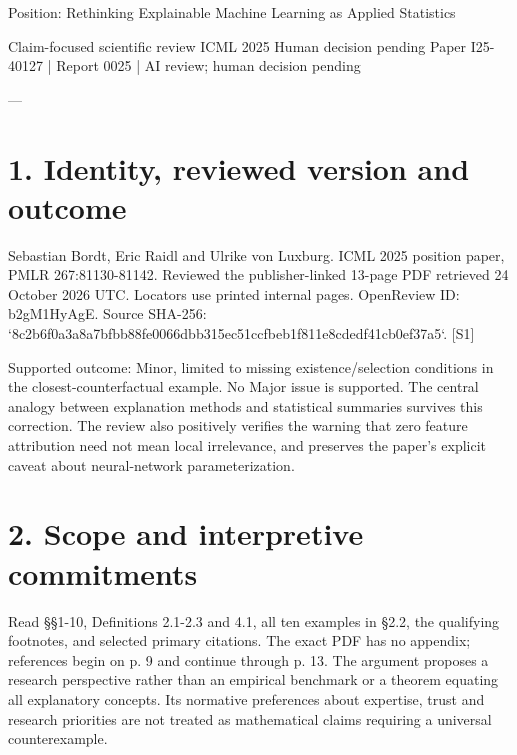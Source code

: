 \documentclass[10pt]{article}
\begin{document}
Position: Rethinking Explainable Machine Learning as Applied Statistics\par
Claim-focused scientific review ICML 2025 Human decision pending
Paper I25-40127 | Report 0025 | AI review; human decision pending\par
---\par
\section*{1. Identity, reviewed version and outcome}
Sebastian Bordt, Eric Raidl and Ulrike von Luxburg. ICML 2025 position paper, PMLR 267:81130-81142. Reviewed the publisher-linked 13-page PDF retrieved 24 October 2026 UTC. Locators use printed internal pages. OpenReview ID: b2gM1HyAgE. Source SHA-256: `8c2b6f0a3a8a7bfbb88fe0066dbb315ec51ccfbeb1f811e8cdedf41cb0ef37a5`. [S1]\par
Supported outcome: Minor, limited to missing existence/selection conditions in the closest-counterfactual example. No Major issue is supported. The central analogy between explanation methods and statistical summaries survives this correction. The review also positively verifies the warning that zero feature attribution need not mean local irrelevance, and preserves the paper’s explicit caveat about neural-network parameterization.\par
\section*{2. Scope and interpretive commitments}
Read §§1-10, Definitions 2.1-2.3 and 4.1, all ten examples in §2.2, the qualifying footnotes, and selected primary citations. The exact PDF has no appendix; references begin on p. 9 and continue through p. 13. The argument proposes a research perspective rather than an empirical benchmark or a theorem equating all explanatory concepts. Its normative preferences about expertise, trust and research priorities are not treated as mathematical claims requiring a universal counterexample.\par
\end{document}
